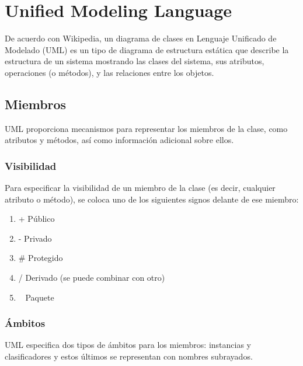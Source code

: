 \section{Unified Modeling Language}

De acuerdo con Wikipedia\cite{wikipedia_diagrama_2020}, un diagrama de clases en Lenguaje Unificado de Modelado (UML) es un tipo de diagrama de estructura estática que describe la estructura de un sistema mostrando las clases del sistema, sus atributos, operaciones (o métodos), y las relaciones entre los objetos.


\subsection*{Miembros}
UML proporciona mecanismos para representar los miembros de la clase, como atributos y métodos, así como información adicional sobre ellos.


\subsubsection*{Visibilidad}
Para especificar la visibilidad de un miembro de la clase (es decir, cualquier atributo o método), se coloca uno de los siguientes signos delante de ese miembro:

\begin{enumerate}
    \item +	Público
    \item -	Privado
    \item \# Protegido
    \item /	Derivado (se puede combinar con otro)
    \item ~	Paquete
\end{enumerate}

\subsubsection*{Ámbitos}

UML especifica dos tipos de ámbitos para los miembros: instancias y clasificadores y estos últimos se representan con nombres subrayados.

